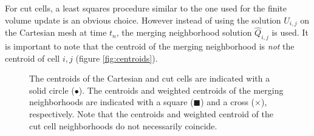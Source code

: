 \begin{enumerate}
\vspace*{.1in}
For cut cells, a least squares procedure  similar to the one used for
the finite volume update is an obvious choice. However instead of using the
solution $U_{i,j}$ on the Cartesian mesh at time $t_n$,
the merging neighborhood solution  $\widehat{Q}_{i,j}$ is used. It is important
to note that the centroid of the merging neighborhood is \textit{not} the centroid of cell ${i,j}$ (figure \ref{fig:centroids}).
\begin{figure}
    \centering
     \hfill
    \caption{The centroids of the Cartesian and cut cells are indicated with a solid circle ($\bullet$).  The centroids and weighted centroids of the merging neighborhoods are indicated with a square ($\blacksquare$) and a cross ($\times$), respectively. Note that the centroids and weighted centroid of the cut cell neighborhoods do not necessarily coincide.}

\end{figure}
\end{enumerate}
